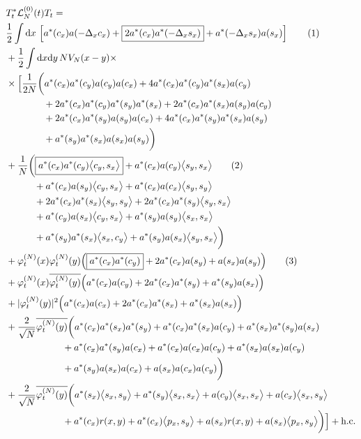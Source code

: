 \documentclass[11pt,a4paper]{scrartcl}
\newcommand{\di}{\textrm{d}}		%
\newcommand{\Lcal}{\mathcal{L}}		%
\newcommand{\hc}{\mbox{h.c.}}		%
\newcommand{\scal}[2]{\big<#1,#2\big>} %
\newcommand{\cc}[1]{\overline{#1}}	%
\newcommand{\ph}{\varphi_t^{(N)}}	%
\newcommand{\tagg}[1]{ \stepcounter{equation} \tag{\theequation} \label{eq:#1} } %
\begin{document}
\begin{align*}
& T^*_t \Lcal_N^{(0)}(t) T_t = \\ 
& \frac{1}{2} \int \di x\, \left[ a^*(c_x) a(-\Delta_x c_x) + \boxed{2 a^*(c_x) a^*(-\Delta_x s_x)} + a^*(-\Delta_x s_x) a(s_x) \right] \tagg{cancellation_kinetic} \\
& + \frac{1}{2}\int \di x \di y\, NV_N(x-y) \times \\
& \times \Big[   \frac{1}{2N}\bigg( a^*(c_x) a^*(c_y) a(c_y) a(c_x) + 4 a^*(c_x) a^*(c_y) a^*(s_x) a(c_y) \\
				      & \qquad\qquad + 2 a^*(c_x) a^*(c_y) a^*(s_y) a^*(s_x) + 2 a^*(c_x) a^*(s_x) a(s_y) a(c_y) \\
				      & \qquad\qquad + 2 a^*(c_x) a^*(s_y) a(s_y) a(c_x) + 4 a^*(c_x) a^*(s_y) a^*(s_x) a(s_y) \\
				      & \qquad\qquad + a^*(s_y) a^*(s_x) a(s_x) a(s_y) \bigg) \\
& + \frac{1}{N}\bigg(   \boxed{a^*(c_x)a^*(c_y) \scal{c_y}{s_x}} + a^*(c_x) a(c_y) \scal{s_y}{s_x} \tagg{cancellation_normalorder} \\
			& \qquad\quad + a^*(c_x) a(s_y) \scal{c_y}{s_x} + a^*(c_x) a(c_x) \scal{s_y}{s_y} \\
			& \qquad\quad + 2 a^*(c_x) a^*(s_x) \scal{s_y}{s_y} + 2a^*(c_x)a^*(s_y) \scal{s_y}{s_x} \\
			& \qquad\quad + a^*(c_y) a(s_x) \scal{c_y}{s_x} +  a^*(s_y) a(s_y) \scal{s_x}{s_x}\\
			& \qquad\quad + a^*(s_y) a^*(s_x) \scal{s_x}{c_y} + a^*(s_y) a(s_x) \scal{s_y}{s_x}   \bigg) \\
& + \ph(x)\ph(y) \Big( \boxed{a^*(c_x) a^*(c_y)} + 2 a^*(c_x) a(s_y) +a(s_x) a(s_y) \Big) \tagg{cancellation_standard} \\
& + \ph(x) \cc{\ph(y)} \Big( a^*(c_x) a(c_y) + 2 a^*(c_x) a^*(s_y) + a^*(s_y) a(s_x) \Big) \\
& + \lvert \ph(y) \rvert^2 \Big( a^*(c_x) a(c_x) + 2 a^*(c_x) a^*(s_x) + a^*(s_x) a(s_x) \Big) \\
& + \frac{2}{\sqrt{N}}\cc{\ph(y)} \bigg(    a^*(c_x) a^*(s_x) a^*(s_y) + a^*(c_x) a^*(s_x) a(c_y) + a^*(s_x) a^*(s_y) a(s_x)\\
					    & \qquad\qquad\qquad + a^*(c_x) a^*(s_y) a(c_x) + a^*(c_x) a(c_x) a(c_y)+ a^*(s_x) a(s_x) a(c_y) \\
					    & \qquad\qquad\qquad + a^*(s_y) a(s_x) a(c_x) + a(s_x) a(c_x) a(c_y)    \bigg) \\
& + \frac{2}{\sqrt{N}}\cc{\ph(y)} \bigg(    a^*(s_x) \scal{s_x}{s_y} + a^*(s_y) \scal{s_x}{s_x}  + a(c_y) \scal{s_x}{s_x} + a(c_x) \scal{s_x}{s_y} \\
					    & \qquad\qquad\qquad + a^*(c_x)r(x,y) + a^*(c_x)\scal{p_x}{s_y} + a(s_x)r(x,y) + a(s_x)\scal{p_x}{s_y}		\bigg)    \Big] + \hc
\end{align*}
\end{document}
